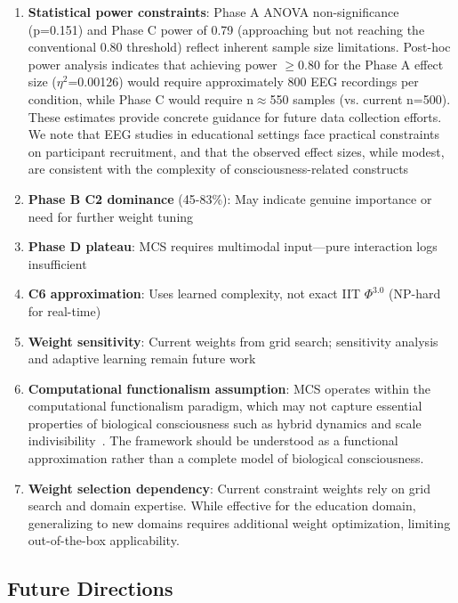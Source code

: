 \documentclass[10pt,journal,compsoc]{IEEEtran}
\begin{document}
\begin{enumerate}
    \item \textbf{Statistical power constraints}: Phase A ANOVA non-significance (p=0.151) and Phase C power of 0.79 (approaching but not reaching the conventional 0.80 threshold) reflect inherent sample size limitations. Post-hoc power analysis indicates that achieving power $\geq$0.80 for the Phase A effect size ($\eta^2$=0.00126) would require approximately 800 EEG recordings per condition, while Phase C would require n$\approx$550 samples (vs. current n=500). These estimates provide concrete guidance for future data collection efforts. We note that EEG studies in educational settings face practical constraints on participant recruitment, and that the observed effect sizes, while modest, are consistent with the complexity of consciousness-related constructs
    \item \textbf{Phase B C2 dominance} (45-83\%): May indicate genuine importance or need for further weight tuning
    \item \textbf{Phase D plateau}: MCS requires multimodal input—pure interaction logs insufficient
    \item \textbf{C6 approximation}: Uses learned complexity, not exact IIT $\Phi^{3.0}$ (NP-hard for real-time)~\cite{oizumi2014}
    \item \textbf{Weight sensitivity}: Current weights from grid search; sensitivity analysis and adaptive learning remain future work
    \item \textbf{Computational functionalism assumption}: MCS operates within the computational functionalism paradigm, which may not capture essential properties of biological consciousness such as hybrid dynamics and scale indivisibility~\cite{Milinkovic2025}. The framework should be understood as a functional approximation rather than a complete model of biological consciousness.
    \item \textbf{Weight selection dependency}: Current constraint weights rely on grid search and domain expertise. While effective for the education domain, generalizing to new domains requires additional weight optimization, limiting out-of-the-box applicability.
\end{enumerate}

\subsection{Future Directions}
\end{document}
